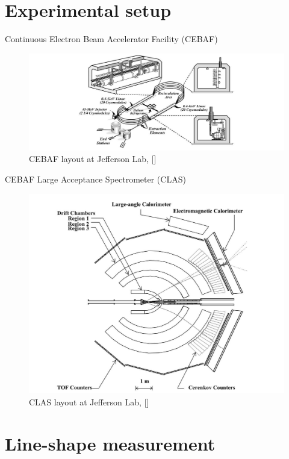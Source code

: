 \documentclass[11pt,aspectratio=1610,dvipsnames]{beamer}
\begin{document}
\section{Experimental setup}
\begin{frame}{Continuous Electron Beam Accelerator Facility (CEBAF)}
	\begin{figure}
		\centering
		\includegraphics[width=\linewidth]{setup_big.jpg}
		\caption{CEBAF layout at Jefferson Lab, [\cite{clas}]}
	\end{figure}
\end{frame}
\begin{frame}{CEBAF Large Acceptance Spectrometer (CLAS)}
	\begin{figure}
		\centering
		\includegraphics[width=.7\linewidth]{setup.jpg}
		\caption{CLAS layout at Jefferson Lab, [\cite{clas}]}
	\end{figure}
\end{frame}


\section{Line-shape measurement}
\end{document}
